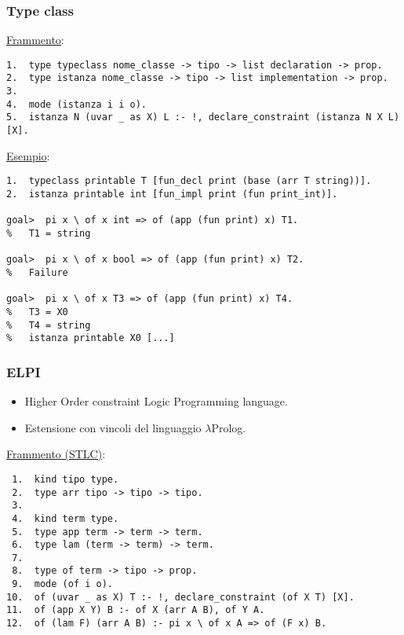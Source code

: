 \documentclass{beamer}
\begin{document}
\begin{frame}[fragile=singleslide]      %
 
 \frametitle{Type class}

 \underline{Frammento}:
 \begin{verbatim}
1.  type typeclass nome_classe -> tipo -> list declaration -> prop.
2.  type istanza nome_classe -> tipo -> list implementation -> prop.
3.
4.  mode (istanza i i o).
5.  istanza N (uvar _ as X) L :- !, declare_constraint (istanza N X L) [X].
 \end{verbatim}

 \vfill

 \underline{Esempio}:
 \begin{verbatim}
1.  typeclass printable T [fun_decl print (base (arr T string))].
2.  istanza printable int [fun_impl print (fun print_int)].

goal>  pi x \ of x int => of (app (fun print) x) T1.
%   T1 = string

goal>  pi x \ of x bool => of (app (fun print) x) T2.
%   Failure

goal>  pi x \ of x T3 => of (app (fun print) x) T4.
%   T3 = X0
%   T4 = string
%   istanza printable X0 [...]
 \end{verbatim}

\end{frame}


\begin{frame}[fragile=singleslide]      %

 \frametitle{ELPI}

 \begin{itemize}
  \item Higher Order constraint Logic Programming language.
  \item Estensione con vincoli del linguaggio $\lambda$Prolog.
 \end{itemize}

 \vfill
 
 \underline{Frammento (STLC)}:
 \begin{verbatim}
 1.  kind tipo type.
 2.  type arr tipo -> tipo -> tipo.
 3.
 4.  kind term type.
 5.  type app term -> term -> term.
 6.  type lam (term -> term) -> term.
 7.
 8.  type of term -> tipo -> prop.
 9.  mode (of i o).
10.  of (uvar _ as X) T :- !, declare_constraint (of X T) [X].
11.  of (app X Y) B :- of X (arr A B), of Y A.
12.  of (lam F) (arr A B) :- pi x \ of x A => of (F x) B.
 \end{verbatim}

\end{frame}
\end{document}
